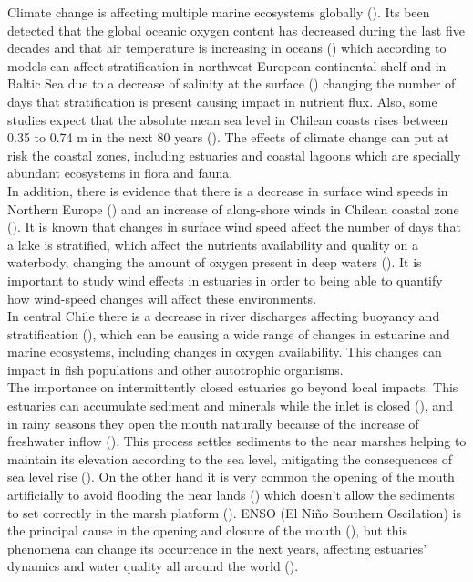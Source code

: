 \documentclass[11pt,letterpaper]{article}
\begin{document}
Climate change is affecting multiple marine ecosystems globally (\cite{hewitt2016multiple}). Its been detected that the global oceanic oxygen content has decreased during the last five decades \cite{schmidtko2017decline} and that air temperature is increasing in oceans (\cite{omstedt2004baltic, jones1999surface}) which according to models can affect stratification in northwest European continental shelf and in Baltic Sea due to a decrease of salinity at the surface (\cite{hordoir2012effect, holt2010potential}) changing the number of days that stratification is present causing impact in nutrient flux. Also, some studies expect that the absolute mean sea level in Chilean coasts rises between 0.35 to 0.74 m in the next 80 years (\cite{winckler2020evidence}). The effects of climate change can put at risk the coastal zones, including estuaries and coastal lagoons which are specially abundant ecosystems in flora and fauna.\\

In addition, there is evidence that there is a decrease in surface wind speeds in Northern Europe (\cite{woolway2017atmospheric}) and an increase of along-shore winds in Chilean coastal zone (\cite{winckler2020evidence}). It is known that changes in surface wind speed affect the number of days that a lake is stratified, which affect the nutrients availability and quality on a waterbody, changing the amount of oxygen present in deep waters (\cite{woolway2017atmospheric}). It is important to study wind effects in estuaries in order to being able to quantify how wind-speed changes will affect these environments.\\

In central Chile there is a decrease in river discharges affecting buoyancy and stratification (\cite{winckler2020evidence}), which can be causing a wide range of changes in estuarine and marine ecosystems, including changes in oxygen availability. This changes can impact in fish populations and other autotrophic organisms.\\

The importance on intermittently closed estuaries go beyond local impacts. This estuaries can accumulate sediment and minerals while the inlet is closed (\cite{thorne2021wetlands}), and in rainy seasons they open the mouth naturally because of the increase of freshwater inflow (\cite{hoeksema2018factors}). This process settles sediments to the near marshes helping to maintain its elevation according to the sea level, mitigating the consequences of sea level rise (\cite{thorne2021wetlands}). On the other hand it is very common the opening of the mouth artificially to avoid flooding the near lands (\cite{Behrens2013}) which doesn't allow the sediments to set correctly in the marsh platform  (\cite{thorne2021wetlands}). ENSO (El Niño Southern Oscilation) is the principal cause in the opening and closure of the mouth (\cite{mcsweeney2017intermittently}), but this phenomena can change its occurrence in the next years, affecting estuaries' dynamics and water quality all around the world (\cite{thorne2021wetlands}).\\
\end{document}
